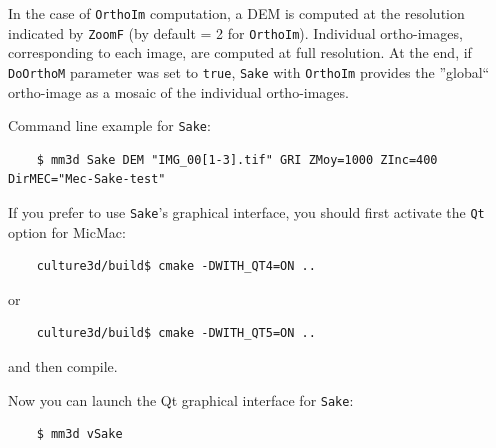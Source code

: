 \vspace*{0.3cm}
In the case of {\tt OrthoIm} computation, a DEM is computed at the resolution indicated by {\tt ZoomF} (by default = 2 for {\tt OrthoIm}). Individual ortho-images, corresponding to each image, are computed at full resolution. At the end, if {\tt DoOrthoM} parameter was set to {\tt true}, {\tt Sake} with {\tt OrthoIm} provides the ''global`` ortho-image as a mosaic of the individual ortho-images.


\vspace*{0.3cm}
Command line example for {\tt Sake}:
\begin{verbatim}
    $ mm3d Sake DEM "IMG_00[1-3].tif" GRI ZMoy=1000 ZInc=400 DirMEC="Mec-Sake-test"
\end{verbatim}

If you prefer to use {\tt Sake}'s graphical interface, you should first activate the {\tt Qt} option for MicMac:
  \begin{verbatim}
    culture3d/build$ cmake -DWITH_QT4=ON ..
  \end{verbatim}
  or
  \begin{verbatim}
    culture3d/build$ cmake -DWITH_QT5=ON ..
  \end{verbatim}
  and then compile.

\vspace{0.5cm}
Now you can launch the Qt graphical interface for {\tt Sake}:
\begin{verbatim}
    $ mm3d vSake
\end{verbatim}









